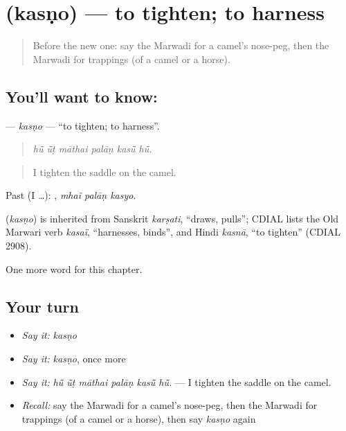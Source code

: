 \section[\texorpdfstring{\mw{कसणो} (kasṇo)}{कसणो (kasṇo)}]{ (kasṇo) — to tighten; to harness}

\label{lesson:MW-C233-kasno}



\begin{quote}
Before the new one: say the Marwadi for a camel's nose-peg, then the Marwadi for trappings (of a camel or a horse).
\end{quote}

\subsection*{You'll want to know: }
\textbf{} — \emph{kasṇo} — \textquotedblleft{}to tighten; to harness\textquotedblright{}.

\begin{quote}
     
\end{quote}

\begin{quote}
\emph{hū̃ ū̃ṭ māthai palāṇ kasū̃ hū̃.}
\end{quote}

\begin{quote}
I tighten the saddle on the camel.
\end{quote}

Past (I …):   , \emph{mhaĩ palāṇ kasyo}.

\begin{cousinweb}
\textbf{} (\emph{kasṇo}) is inherited from Sanskrit \emph{karṣati}, \textquotedblleft{}draws, pulls\textquotedblright{}; CDIAL lists the Old Marwari verb \emph{kasaï}, \textquotedblleft{}harnesses, binds\textquotedblright{}, and Hindi \emph{kasnā}, \textquotedblleft{}to tighten\textquotedblright{} (CDIAL 2908).
\end{cousinweb}

\begin{grammarlens}[title={What you've built}]
One more word for this chapter.
\end{grammarlens}

\subsection*{Your turn}
\begin{itemize}
\raggedright
  \item \emph{Say it:} \emph{kasṇo}
  \item \emph{Say it:} \emph{kasṇo}, once more
  \item \emph{Say it:} \emph{hū̃ ū̃ṭ māthai palāṇ kasū̃ hū̃.} — I tighten the saddle on the camel.
  \item \emph{Recall:} say the Marwadi for a camel's nose-peg, then the Marwadi for trappings (of a camel or a horse), then say \emph{kasṇo} again
\end{itemize}


